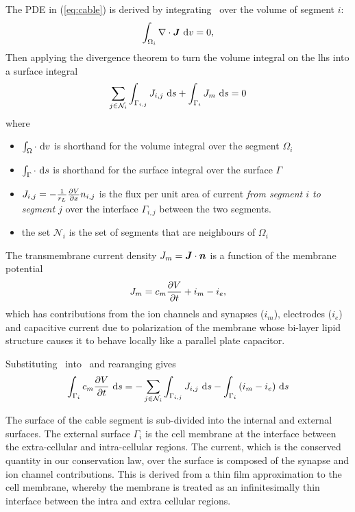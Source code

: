 The PDE in (\ref{eq:cable}) is derived by integrating~ over the volume of segment $i$:
\begin{equation*}
    \int_{\Omega_i}{\nabla \cdot \bm{J} } ~\text{d}{v} = 0,
\end{equation*}
Then applying the divergence theorem to turn the volume integral on the lhs into a surface integral
\begin{equation}
          \sum_{j\in\mathcal{N}_i} {\int_{\Gamma_{i,j}} J_{i,j} ~\text{d}{s} }
        + \int_{\Gamma_{i}} {J_m} ~\text{d}{s} = 0
    \label{eq:cable_balance_intermediate}
\end{equation}
where
\begin{itemize}
    \item $\int_\Omega \cdot ~\text{d}{v}$ is shorthand for the volume integral over the segment $\Omega_i$
    \item $\int_\Gamma \cdot ~\text{d}{s}$ is shorthand for the surface integral over the surface $\Gamma$
    \item $J_{i,j}=-\frac{1}{r_L}\frac{\partial{V}}{\partial{x}} n_{i,j}$ is the flux per unit area of current \emph{from segment $i$ to segment $j$} over the interface $\Gamma_{i,j}$ between the two segments.
    \item the set $\mathcal{N}_i$ is the set of segments that are neighbours of $\Omega_i$
\end{itemize}
The transmembrane current density $J_m=\bm{J}\cdot\bm{n}$ is a function of the membrane potential
\begin{equation}
    J_m = c_m\frac{\partial{V}}{\partial{t}} + i_m - i_e,
    \label{eq:Jm}
\end{equation}
which has contributions from the ion channels and synapses ($i_m$), electrodes ($i_e$) and capacitive current due to polarization of the membrane whose bi-layer lipid structure causes it to behave locally like a parallel plate capacitor.

Substituting~ into~ and rearanging gives
\begin{equation}
      \int_{\Gamma_{i}} {c_m\frac{\partial{V}}{\partial{t}}} ~\text{d}{s}
    = - \sum_{j\in\mathcal{N}_i} {\int_{\Gamma_{i,j}} J_{i,j} ~\text{d}{s} }
    - \int_{\Gamma_{i}} {(i_m - i_e)} ~\text{d}{s}
    \label{eq:cable_balance}
\end{equation}


The surface of the cable segment is sub-divided into the internal and external surfaces.
The external surface $\Gamma_{i}$ is the cell membrane at the interface between the extra-cellular and intra-cellular regions.
The current, which is the conserved quantity in our conservation law, over the surface is composed of the synapse and ion channel contributions.
This is derived from a thin film approximation to the cell membrane, whereby the membrane is treated as an infinitesimally thin interface between the intra and extra cellular regions.

